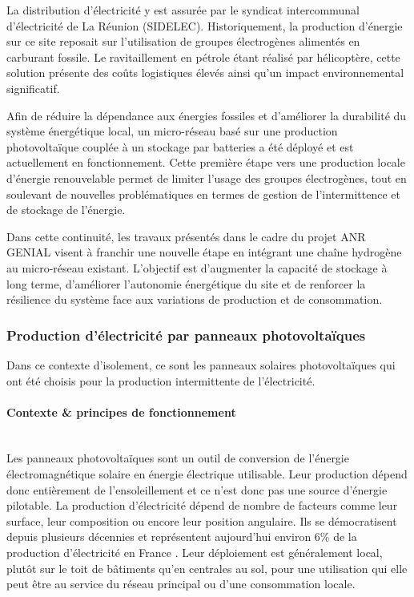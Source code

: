 La distribution d'électricité y est assurée par le syndicat intercommunal d'électricité de La Réunion (SIDELEC). Historiquement, la production d'énergie sur ce site reposait sur l'utilisation de groupes électrogènes alimentés en carburant fossile. Le ravitaillement en pétrole étant réalisé par hélicoptère, cette solution présente des coûts logistiques élevés ainsi qu'un impact environnemental significatif.

Afin de réduire la dépendance aux énergies fossiles et d'améliorer la durabilité du système énergétique local, un micro-réseau basé sur une production photovoltaïque couplée à un stockage par batteries a été déployé et est actuellement en fonctionnement. Cette première étape vers une production locale d'énergie renouvelable permet de limiter l'usage des groupes électrogènes, tout en soulevant de nouvelles problématiques en termes de gestion de l'intermittence et de stockage de l'énergie.

Dans cette continuité, les travaux présentés dans le cadre du projet ANR GENIAL visent à franchir une nouvelle étape en intégrant une chaîne hydrogène au micro-réseau existant. L'objectif est d'augmenter la capacité de stockage à long terme, d'améliorer l'autonomie énergétique du site et de renforcer la résilience du système face aux variations de production et de consommation.

\subsubsection{Production d'électricité par panneaux photovoltaïques}
Dans ce contexte d'isolement, ce sont les panneaux solaires photovoltaïques qui ont été choisis pour la production intermittente de l'électricité.
\paragraph{Contexte \& principes de fonctionnement} \hfill \\
Les panneaux photovoltaïques sont un outil de conversion de l'énergie électromagnétique solaire en énergie électrique utilisable. Leur production dépend donc entièrement de l'ensoleillement et ce n'est donc pas une source d'énergie pilotable. La production d'électricité dépend de nombre de facteurs comme leur surface, leur composition ou encore leur position angulaire. Ils se démocratisent depuis plusieurs décennies et représentent aujourd'hui environ 6\% de la production d'électricité en France \cite{noauthor_be_nodate}. Leur déploiement est généralement local, plutôt sur le toit de bâtiments qu'en centrales au sol, pour une utilisation qui elle peut être au service du réseau principal ou d'une consommation locale.

